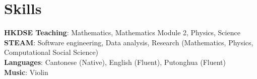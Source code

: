 \documentclass[letterpaper,11pt]{article}
\begin{document}
%
\section{Skills}
 \begin{itemize}[leftmargin=0.15in, label={}]
    \small{\item{
     \textbf{HKDSE Teaching}{: Mathematics, Mathematics Module 2, Physics, Science} \\
     \textbf{STEAM}{: Software engineering, Data analysis, Research (Mathematics, Physics, Computational Social Science)} \\
     \textbf{Languages}{: Cantonese (Native), English (Fluent), Putonghua (Fluent)} \\
     \textbf{Music}{: Violin}
    }}
 \end{itemize}


\end{document}
